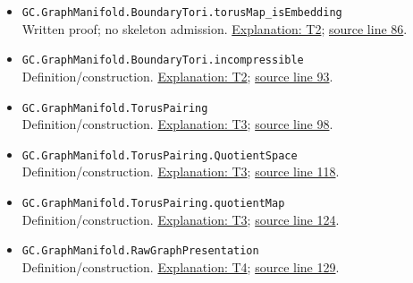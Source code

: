 \documentclass[
  letterpaper,
  11pt]{article}
\begin{document}
\begin{itemize}
{  line 82}.
\item
  {\small\texttt{GC.\allowbreak{}Graph\allowbreak{}Manifold.\allowbreak{}Boundary\allowbreak{}Tori.\allowbreak{}torus\allowbreak{}Map\_\allowbreak{}is\allowbreak{}Embedding}}\\
  Written proof; no skeleton admission. \hyperref[t2]{Explanation: T2};
  \href{https://github.com/qinz1yang/differential-geometry-dev/blob/ea0fae60ee01ef8c8d9b57a51794c6538f679c5d/DifferentialGeometry/Topology/ThreeManifold/GraphManifold/Presentation.lean\#L86}{source
  line 86}.
\item
  {\small\texttt{GC.\allowbreak{}Graph\allowbreak{}Manifold.\allowbreak{}Boundary\allowbreak{}Tori.\allowbreak{}incompressible}}\\
  Definition/construction. \hyperref[t2]{Explanation: T2};
  \href{https://github.com/qinz1yang/differential-geometry-dev/blob/ea0fae60ee01ef8c8d9b57a51794c6538f679c5d/DifferentialGeometry/Topology/ThreeManifold/GraphManifold/Presentation.lean\#L93}{source
  line 93}.
\item
  {\small\texttt{GC.\allowbreak{}Graph\allowbreak{}Manifold.\allowbreak{}Torus\allowbreak{}Pairing}}\\
  Definition/construction. \hyperref[t3]{Explanation: T3};
  \href{https://github.com/qinz1yang/differential-geometry-dev/blob/ea0fae60ee01ef8c8d9b57a51794c6538f679c5d/DifferentialGeometry/Topology/ThreeManifold/GraphManifold/Presentation.lean\#L98}{source
  line 98}.
\item
  {\small\texttt{GC.\allowbreak{}Graph\allowbreak{}Manifold.\allowbreak{}Torus\allowbreak{}Pairing.\allowbreak{}Quotient\allowbreak{}Space}}\\
  Definition/construction. \hyperref[t3]{Explanation: T3};
  \href{https://github.com/qinz1yang/differential-geometry-dev/blob/ea0fae60ee01ef8c8d9b57a51794c6538f679c5d/DifferentialGeometry/Topology/ThreeManifold/GraphManifold/Presentation.lean\#L118}{source
  line 118}.
\item
  {\small\texttt{GC.\allowbreak{}Graph\allowbreak{}Manifold.\allowbreak{}Torus\allowbreak{}Pairing.\allowbreak{}quotient\allowbreak{}Map}}\\
  Definition/construction. \hyperref[t3]{Explanation: T3};
  \href{https://github.com/qinz1yang/differential-geometry-dev/blob/ea0fae60ee01ef8c8d9b57a51794c6538f679c5d/DifferentialGeometry/Topology/ThreeManifold/GraphManifold/Presentation.lean\#L124}{source
  line 124}.
\item
  {\small\texttt{GC.\allowbreak{}Graph\allowbreak{}Manifold.\allowbreak{}Raw\allowbreak{}Graph\allowbreak{}Presentation}}\\
  Definition/construction. \hyperref[t4]{Explanation: T4};
  \href{https://github.com/qinz1yang/differential-geometry-dev/blob/ea0fae60ee01ef8c8d9b57a51794c6538f679c5d/DifferentialGeometry/Topology/ThreeManifold/GraphManifold/Presentation.lean\#L129}{source
  line 129}.
\end{itemize}
\end{document}
